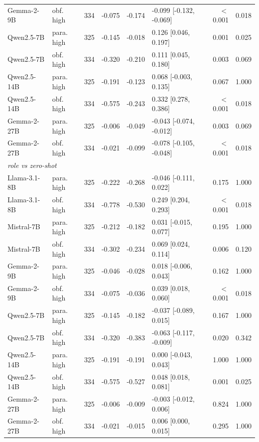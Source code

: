\begin{tabular}{llrrrlrr}
Gemma-2-9B & obf. high & 334 & -0.075 & -0.174 & -0.099 [-0.132, -0.069] & $<$0.001 & 0.018 \\
Qwen2.5-7B & para. high & 325 & -0.145 & -0.018 & 0.126 [0.046, 0.197] & 0.001 & 0.025 \\
Qwen2.5-7B & obf. high & 334 & -0.320 & -0.210 & 0.111 [0.045, 0.180] & 0.003 & 0.069 \\
Qwen2.5-14B & para. high & 325 & -0.191 & -0.123 & 0.068 [-0.003, 0.135] & 0.067 & 1.000 \\
Qwen2.5-14B & obf. high & 334 & -0.575 & -0.243 & 0.332 [0.278, 0.386] & $<$0.001 & 0.018 \\
Gemma-2-27B & para. high & 325 & -0.006 & -0.049 & -0.043 [-0.074, -0.012] & 0.003 & 0.069 \\
Gemma-2-27B & obf. high & 334 & -0.021 & -0.099 & -0.078 [-0.105, -0.048] & $<$0.001 & 0.018 \\
\midrule
\multicolumn{8}{l}{\textit{role vs zero-shot}} \\
Llama-3.1-8B & para. high & 325 & -0.222 & -0.268 & -0.046 [-0.111, 0.022] & 0.175 & 1.000 \\
Llama-3.1-8B & obf. high & 334 & -0.778 & -0.530 & 0.249 [0.204, 0.293] & $<$0.001 & 0.018 \\
Mistral-7B & para. high & 325 & -0.212 & -0.182 & 0.031 [-0.015, 0.077] & 0.195 & 1.000 \\
Mistral-7B & obf. high & 334 & -0.302 & -0.234 & 0.069 [0.024, 0.114] & 0.006 & 0.120 \\
Gemma-2-9B & para. high & 325 & -0.046 & -0.028 & 0.018 [-0.006, 0.043] & 0.162 & 1.000 \\
Gemma-2-9B & obf. high & 334 & -0.075 & -0.036 & 0.039 [0.018, 0.060] & $<$0.001 & 0.018 \\
Qwen2.5-7B & para. high & 325 & -0.145 & -0.182 & -0.037 [-0.089, 0.015] & 0.167 & 1.000 \\
Qwen2.5-7B & obf. high & 334 & -0.320 & -0.383 & -0.063 [-0.117, -0.009] & 0.020 & 0.342 \\
Qwen2.5-14B & para. high & 325 & -0.191 & -0.191 & 0.000 [-0.043, 0.043] & 1.000 & 1.000 \\
Qwen2.5-14B & obf. high & 334 & -0.575 & -0.527 & 0.048 [0.018, 0.081] & 0.001 & 0.025 \\
Gemma-2-27B & para. high & 325 & -0.006 & -0.009 & -0.003 [-0.012, 0.006] & 0.824 & 1.000 \\
Gemma-2-27B & obf. high & 334 & -0.021 & -0.015 & 0.006 [0.000, 0.015] & 0.295 & 1.000 \\
\bottomrule
\end{tabular}
